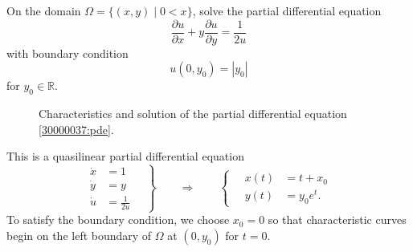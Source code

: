 On the domain $\Omega = \{ (x,y)\mid 0<x\}$, solve the partial differential
equation
\begin{equation}
\frac{\partial u}{\partial x} + y\frac{\partial u}{\partial y} = \frac{1}{2u}
\label{30000037:pde}
\end{equation}
with boundary condition
\begin{equation}
u(0,y_0) = |y_0|
\label{30000037:boundary}
\end{equation}
for $y_0\in\mathbb{R}$.

\begin{loesung}
\begin{figure}
\centering
{}
\caption{Characteristics and solution of the partial differential equation
\eqref{30000037:pde}.
\label{30000037:fig}}
\end{figure}
This is a quasilinear partial differential equation 
\[
\left.
\begin{aligned}
\dot{x} &= 1 \\
\dot{y} &= y \\
\dot{u} &= \frac{1}{2u}
\end{aligned}
\quad
\right\}
\qquad\Rightarrow\qquad
\left\{
\quad
\begin{aligned}
x(t) &= t + x_0 \\
y(t) &= y_0e^t.
\end{aligned}
\right.
\]
To satisfy the boundary condition, we choose $x_0=0$ so that characteristic
curves begin on the left boundary of $\Omega$ at $(0,y_0)$ for $t=0$.


\end{loesung}

